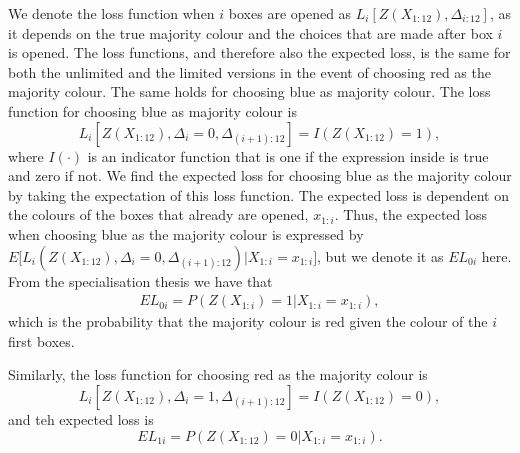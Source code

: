 We denote the loss function when $i$ boxes are opened as $L_i[Z(X_{1:12}),\Delta_{i:12}]$, as it depends on the true majority colour and the choices that are made after box $i$ is opened.
The loss functions, and therefore also the expected loss, is the same for both the unlimited and the limited versions in the event of choosing red as the majority colour. The same holds for choosing blue as majority colour. The loss function for choosing blue as majority colour is
\begin{equation}
\label{loss_func_blue}
    L_i[Z(X_{1:12}),\Delta_i=0,\Delta_{(i+1):12}] =  I(Z(X_{1:12})=1),
\end{equation}
where $I(\cdot)$ is an indicator function that is one if the expression inside is true and zero if not. We find the expected loss for choosing blue as the majority colour by taking the expectation of this loss function. The expected loss is dependent on the colours of the boxes that already are opened, $x_{1:i}$. Thus, the expected loss when choosing blue as the majority colour is expressed by $E \big[ L_i (Z(X_{1:12}), \Delta_i=0, \Delta_{(i+1):12})|X_{1:i}=x_{1:i} \big]$, but we denote it as $EL_{0i}$ here. From the specialisation thesis we have that
\begin{equation}
    \label{exp_loss_blue}
    \begin{aligned}
     EL_{0i} = P(Z(X_{1:i})=1|X_{1:i}=x_{1:i}),
    \end{aligned}
\end{equation}
which is the probability that the majority colour is red given the colour of the $i$ first boxes. 


Similarly, the loss function for choosing red as the majority colour is 
\begin{equation}
    \label{loss_func_red}
    L_i[Z(X_{1:12}),\Delta_i=1,\Delta_{(i+1):12}] =  I(Z(X_{1:12})=0),
\end{equation}
and teh expected loss is
\begin{equation}
    \label{exp_loss_red}
    EL_{1i} = P(Z(X_{1:12})=0|X_{1:i}=x_{1:i}).
\end{equation}


